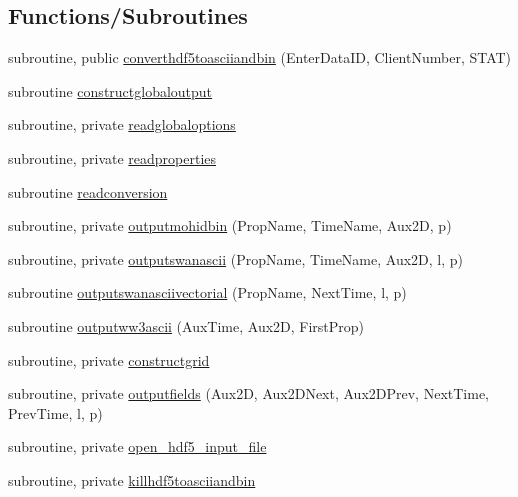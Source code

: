 \subsection*{Functions/\+Subroutines}
\begin{DoxyCompactItemize}
\item 
subroutine, public \mbox{\hyperlink{namespacemodulehdf5toasciiandbin_a043d466c48df398adb80b3cb771a0b47}{converthdf5toasciiandbin}} (Enter\+Data\+ID, Client\+Number, S\+T\+AT)
\item 
subroutine \mbox{\hyperlink{namespacemodulehdf5toasciiandbin_ae2d0b8b9ab26e879bc85d79fd4815b5d}{constructglobaloutput}}
\item 
subroutine, private \mbox{\hyperlink{namespacemodulehdf5toasciiandbin_acdf03424042f9020f63ddb9bd5d39fce}{readglobaloptions}}
\item 
subroutine, private \mbox{\hyperlink{namespacemodulehdf5toasciiandbin_afad7dca87cff93eae4b5e8a18fdbbec3}{readproperties}}
\item 
subroutine \mbox{\hyperlink{namespacemodulehdf5toasciiandbin_aac7befc5bf0dee74c56166ddb4432fca}{readconversion}}
\item 
subroutine, private \mbox{\hyperlink{namespacemodulehdf5toasciiandbin_aff18abddac541bb4eb02be3abb3aa389}{outputmohidbin}} (Prop\+Name, Time\+Name, Aux2D, p)
\item 
subroutine, private \mbox{\hyperlink{namespacemodulehdf5toasciiandbin_ad9bbff03f3e4066dec1d8a161e2d0be4}{outputswanascii}} (Prop\+Name, Time\+Name, Aux2D, l, p)
\item 
subroutine \mbox{\hyperlink{namespacemodulehdf5toasciiandbin_a1065af2accb4bf167b115af350e3c406}{outputswanasciivectorial}} (Prop\+Name, Next\+Time, l, p)
\item 
subroutine \mbox{\hyperlink{namespacemodulehdf5toasciiandbin_a360088fc269895ed548f164fb5b46a13}{outputww3ascii}} (Aux\+Time, Aux2D, First\+Prop)
\item 
subroutine, private \mbox{\hyperlink{namespacemodulehdf5toasciiandbin_aa5588d4c881fba9ebc04c57393f30c76}{constructgrid}}
\item 
subroutine, private \mbox{\hyperlink{namespacemodulehdf5toasciiandbin_a086893f6436263f0d9e808b779d5441d}{outputfields}} (Aux2D, Aux2\+D\+Next, Aux2\+D\+Prev, Next\+Time, Prev\+Time, l, p)
\item 
subroutine, private \mbox{\hyperlink{namespacemodulehdf5toasciiandbin_ac11d594ac1ad5acf256f4066315f5028}{open\+\_\+hdf5\+\_\+input\+\_\+file}}
\item 
subroutine, private \mbox{\hyperlink{namespacemodulehdf5toasciiandbin_ae236e6042f891aa8f0a07236763a82d6}{killhdf5toasciiandbin}}
\end{DoxyCompactItemize}
